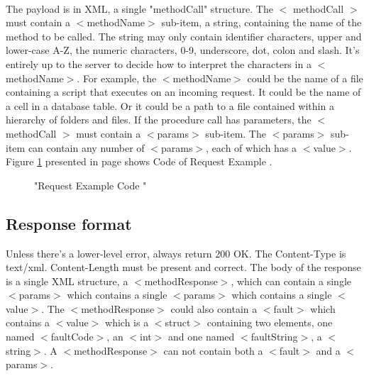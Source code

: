 \documentclass[12pt,a4paper,class,twoside,openany]{report}
\begin{document}
{\paragraph*{\hspace{.9 cm} } The payload is in XML, a single "methodCall" structure.
The  $<$ methodCall $>$    must contain a $<$methodName$>$ sub-item, a string, containing the name of the method to be called. The string may only contain identifier characters, upper and lower-case A-Z, the numeric characters, 0-9, underscore, dot, colon and slash. It's entirely up to the server to decide how to interpret the characters in a $<$methodName$>$. 
For example, the $<$methodName$>$ could be the name of a file containing a script that executes on an incoming request. It could be the name of a cell in a database table. Or it could be a path to a file contained within a hierarchy of folders and files.
If the procedure call has parameters, the  $<$ methodCall $>$ must contain a $<$params$>$ sub-item. The $<$params$>$ sub-item can contain any number of $<$params$>$, each of which has a $<$value$>$. Figure \ref{fg:7-4} presented in page \pageref{fg:7-4} shows Code of Request Example .
\begin{figure}
\begin{center}
\caption{"Request Example Code "}
\label{fg:7-4}
\end{center}
\end{figure}
\subsection{Response format}
Unless there's a lower-level error, always return 200 OK.
The Content-Type is text/xml. Content-Length must be present and correct.
The body of the response is a single XML structure, a $<$methodResponse$>$, which can contain a single $<$params$>$ which contains a single $<$params$>$ which contains a single $<$value$>$.
The $<$methodResponse$>$ could also contain a $<$fault$>$ which contains a $<$value$>$ which is a $<$struct$>$ containing two elements, one named $<$faultCode$>$, an $<$int$>$ and one named $<$faultString$>$, a $<$string$>$.
A $<$methodResponse$>$ can not contain both a $<$fault$>$ and a $<$params$>$.
}
\end{document}
